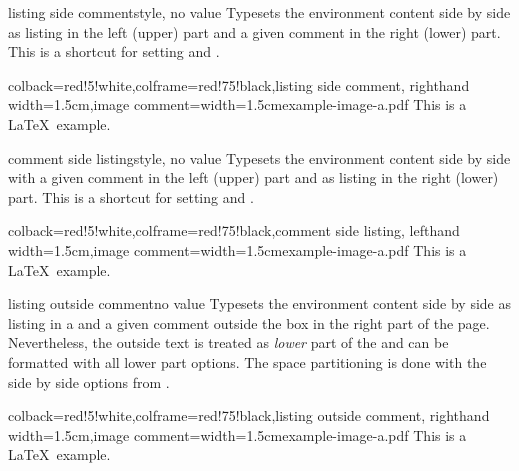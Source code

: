 \begin{docTcbKey}{listing side comment}{}{style, no value}
Typesets the environment content side by side as listing in the left (upper)
part and a given comment in the right (lower) part.
This is a shortcut for setting  and .
\begin{dispExample}
\begin{tcblisting}{colback=red!5!white,colframe=red!75!black,listing side comment,
  righthand width=1.5cm,image comment={width=1.5cm}{example-image-a.pdf}}
This is a \LaTeX\ example.
\end{tcblisting}
\end{dispExample}
\end{docTcbKey}


\begin{docTcbKey}{comment side listing}{}{style, no value}
Typesets the environment content side by side with a given comment in the left (upper)
part and as listing in the right (lower) part.
This is a shortcut for setting  and .
\begin{dispExample}
\begin{tcblisting}{colback=red!5!white,colframe=red!75!black,comment side listing,
  lefthand width=1.5cm,image comment={width=1.5cm}{example-image-a.pdf}}
This is a \LaTeX\ example.
\end{tcblisting}
\end{dispExample}
\end{docTcbKey}

\clearpage

\begin{docTcbKey}{listing outside comment}{}{no value}
Typesets the environment content side by side as listing in a 
and a given comment outside the box in the right part of the page.
Nevertheless, the outside text is treated as \emph{lower} part of the
 and can be formatted with all lower part options.
The space partitioning is done with the side by side options from
.
\begin{dispExample}
\begin{tcblisting}{colback=red!5!white,colframe=red!75!black,listing outside comment,
  righthand width=1.5cm,image comment={width=1.5cm}{example-image-a.pdf}}
This is a \LaTeX\ example.
\end{tcblisting}
\end{dispExample}
\end{docTcbKey}


